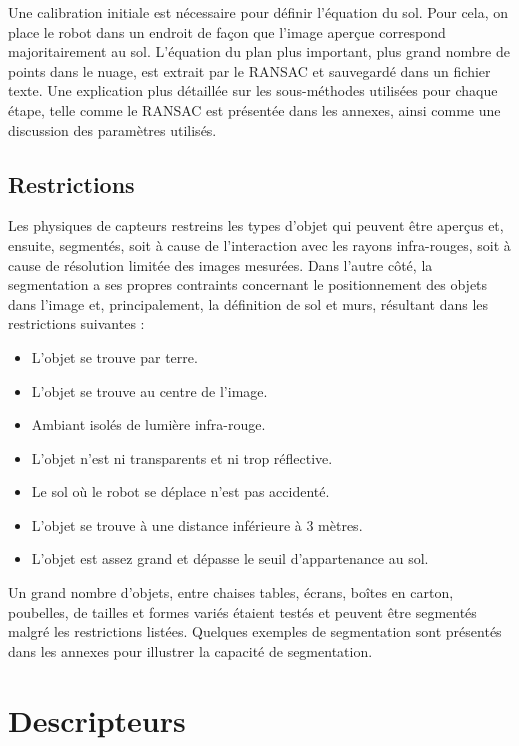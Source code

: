 Une calibration initiale est nécessaire pour définir l'équation du
sol. Pour cela, on place le robot dans un endroit de façon que l'image
aperçue correspond majoritairement au sol. L’équation du plan plus
important, plus grand nombre de points dans le nuage, est extrait par
le RANSAC et sauvegardé dans un fichier texte. Une explication plus
détaillée sur les sous-méthodes utilisées pour chaque étape, telle
comme le RANSAC est présentée dans les annexes, ainsi comme une
discussion des paramètres utilisés.

\subsection{Restrictions} Les physiques de capteurs restreins les
types d'objet qui peuvent être aperçus et, ensuite, segmentés, soit à
cause de l'interaction avec les rayons infra-rouges, soit à cause de
résolution limitée des images mesurées. Dans l'autre côté, la
segmentation a ses propres contraints concernant le positionnement des
objets dans l'image et, principalement, la définition de sol et murs,
résultant dans les restrictions suivantes :\\

\begin{itemize}
\item L'objet se trouve par terre.
\item L'objet se trouve au centre de l'image.
\item Ambiant isolés de lumière infra-rouge.
\item L'objet n'est ni transparents et ni trop réflective.
\item Le sol où le robot se déplace n'est pas accidenté.
\item L'objet se trouve à une distance inférieure à 3 mètres.
\item L'objet est assez grand et dépasse le seuil d'appartenance au sol.\\

\end{itemize} 

Un grand nombre d'objets, entre chaises tables, écrans, boîtes en
carton, poubelles, de tailles et formes variés étaient testés et
peuvent être segmentés malgré les restrictions listées. Quelques
exemples de segmentation sont présentés dans les annexes pour illustrer
la capacité de segmentation.

\section{Descripteurs}

